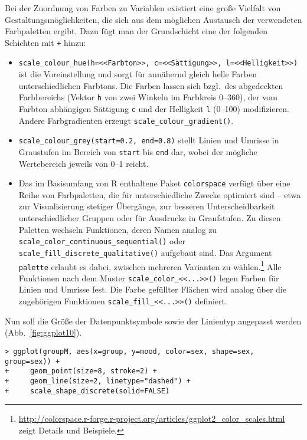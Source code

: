 Bei der Zuordnung von Farben zu Variablen existiert eine große Vielfalt von Gestaltungsmöglichkeiten, die sich aus dem möglichen Austausch der verwendeten Farbpaletten ergibt. Dazu fügt man der Grundschicht eine der folgenden Schichten mit \lstinline!+! hinzu:
\begin{itemize}
\item {} \lstinline!scale_colour_hue(h=<<Farbton>>, c=<<Sättigung>>, l=<<Helligkeit>>)! ist die Voreinstellung und sorgt für annähernd gleich helle Farben unterschiedlichen Farbtons. Die Farben lassen sich bzgl.\ des abgedeckten Farbbereichs (Vektor \lstinline!h! von zwei Winkeln im Farbkreis 0--360), der vom Farbton abhängigen Sättigung \lstinline!c! und der Helligkeit \lstinline!l! (0--100) modifizieren. Andere Farbgradienten erzeugt  \lstinline!scale_colour_gradient()!.
\item {} \lstinline!scale_colour_grey(start=0.2, end=0.8)! stellt Linien und Umrisse in Graustufen im Bereich von \lstinline!start! bis \lstinline!end! dar, wobei der mögliche Wertebereich jeweils von 0--1 reicht.
\item Das im Basisumfang von R enthaltene Paket  \lstinline!colorspace! verfügt über eine Reihe von Farbpaletten, die für unterschiedliche Zwecke optimiert sind -- etwa zur Visualisierung stetiger Übergänge, zur besseren Unterscheidbarkeit unterschiedlicher Gruppen oder für Ausdrucke in Graufstufen. Zu diesen Paletten wechseln Funktionen, deren Namen analog zu  \lstinline!scale_color_continuous_sequential()! oder  \lstinline!scale_fill_discrete_qualitative()! aufgebaut sind. Das Argument \lstinline!palette! erlaubt es dabei, zwischen mehreren Varianten zu wählen.\footnote{\url{http://colorspace.r-forge.r-project.org/articles/ggplot2_color_scales.html} zeigt Details und Beispiele.} Alle Funktionen nach dem Muster \lstinline!scale_color_<<...>>()! legen Farben für Linien und Umrisse fest. Die Farbe gefüllter Flächen wird analog über die zugehörigen Funktionen \lstinline!scale_fill_<<...>>()! definiert.
\end{itemize}

Nun soll die Größe der Datenpunktsymbole sowie der Linientyp angepasst werden (Abb.\ \ref{fig:ggplot10}).
\begin{lstlisting}
> ggplot(groupM, aes(x=group, y=mood, color=sex, shape=sex, group=sex)) +
+     geom_point(size=8, stroke=2) +
+     geom_line(size=2, linetype="dashed") +
+     scale_shape_discrete(solid=FALSE)
\end{lstlisting}

